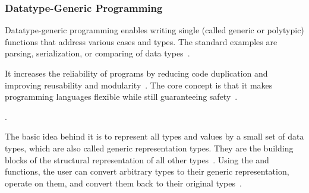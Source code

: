 \begin{frame}\frametitle{Datatype-Generic Programming}
    
Datatype-generic programming enables writing single (called generic or polytypic) functions that address various cases and types. The standard examples are parsing,  serialization, or comparing of data types~\cite{derivable-type-classes}.
 
It increases the reliability of programs by reducing code duplication and improving reusability and modularity~\cite{optimizing-generics}. The core concept is that it makes programming languages flexible while still guaranteeing safety~\cite{datatype-generic-programming}.
  
. 
    
The basic idea behind it is to represent all types and values by a small set of data types, which are also called generic representation types. They are the building blocks of the structural representation of all other types~\cite{optimizing-generics}.
Using the  and  functions, the user can convert arbitrary types to their generic representation, operate on them, and convert them back to their original types~\cite{optimizing-generics,history-of-haskell, ghc-generics}.

\end{frame}


